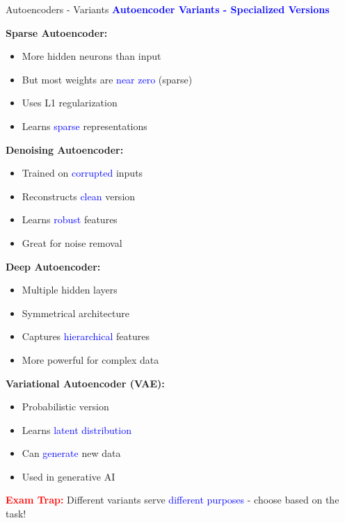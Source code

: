 \documentclass[8pt]{beamer}
\begin{document}
	\begin{frame}{Autoencoders - Variants}
		\fontsize{6.5}{7.5}\selectfont
		\textcolor{blue}{\textbf{Autoencoder Variants - Specialized Versions}}
		
		\textbf{Sparse Autoencoder:}
		\begin{itemize}
			\item More hidden neurons than input
			\item But most weights are \textcolor{blue}{near zero} (sparse)
			\item Uses L1 regularization
			\item Learns \textcolor{blue}{sparse} representations
		\end{itemize}
		
		\textbf{Denoising Autoencoder:}
		\begin{itemize}
			\item Trained on \textcolor{blue}{corrupted} inputs
			\item Reconstructs \textcolor{blue}{clean} version
			\item Learns \textcolor{blue}{robust} features
			\item Great for noise removal
		\end{itemize}
		
		\textbf{Deep Autoencoder:}
		\begin{itemize}
			\item Multiple hidden layers
			\item Symmetrical architecture
			\item Captures \textcolor{blue}{hierarchical} features
			\item More powerful for complex data
		\end{itemize}
		
		\textbf{Variational Autoencoder (VAE):}
		\begin{itemize}
			\item Probabilistic version
			\item Learns \textcolor{blue}{latent distribution}
			\item Can \textcolor{blue}{generate} new data
			\item Used in generative AI
		\end{itemize}
		
		\textcolor{red}{\textbf{Exam Trap:}} Different variants serve \textcolor{blue}{different purposes} - choose based on the task!
	\end{frame}
	
\end{document}
